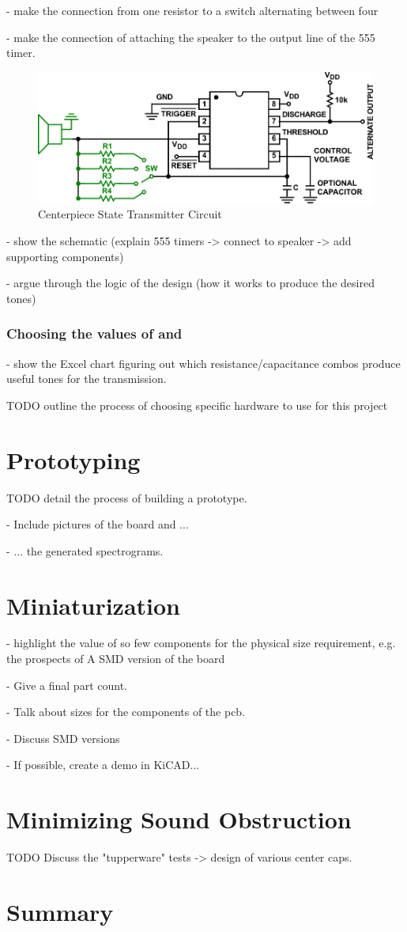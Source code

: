 - make the connection from one resistor to a switch alternating between four

- make the connection of attaching the speaker to the output line of the 555 timer.
\begin{figure}[h]
    \centering
    \caption{Centerpiece State Transmitter Circuit}
    \label{fig:555_astable_modded}
    \includegraphics[width=\linewidth]{Figures/6 PCB Design/555_astable_modded.png}
\end{figure}

 - show the schematic (explain 555 timers -> connect to speaker -> add supporting components)

 - argue through the logic of the design (how it works to produce the desired tones)

\subsubsection{Choosing the values of  and }
 - show the Excel chart figuring out which resistance/capacitance combos produce useful tones for the transmission.

TODO outline the process of choosing specific hardware to use for this project

\section{Prototyping}

TODO detail the process of building a prototype.

- Include pictures of the board and ...

- ... the generated spectrograms.

\section{Miniaturization}
- highlight the value of so few components for the physical size requirement, e.g. the prospects of A SMD version of the board

- Give a final part count.

- Talk about sizes for the components of the pcb.

- Discuss SMD versions

- If possible, create a demo in KiCAD...

\section{Minimizing Sound Obstruction}
TODO Discuss the "tupperware" tests -> design of various center caps.

\section{Summary}
